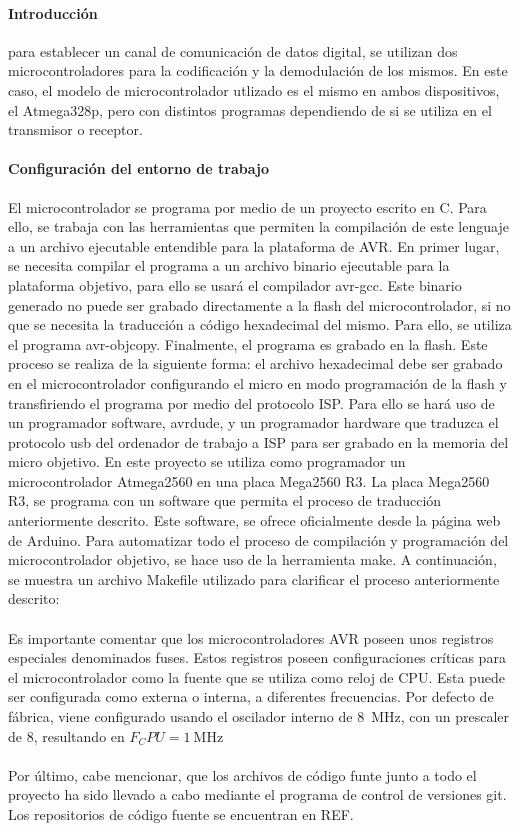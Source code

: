\paragraph{Introducci\'on}
para establecer un canal de comunicación de datos digital, se utilizan dos microcontroladores para la codificación y la demodulación de los mismos. En este caso, el modelo de microcontrolador utlizado es el mismo en ambos dispositivos, el Atmega328p, pero con distintos programas dependiendo de si se utiliza en el transmisor o receptor.

\paragraph{Configuraci\'on del entorno de trabajo}
El microcontrolador se programa por medio de un proyecto escrito en C. Para ello, se trabaja con las herramientas que permiten la compilación de este lenguaje a un archivo ejecutable entendible para la plataforma de AVR.
En primer lugar, se necesita compilar el programa a un archivo binario ejecutable para la plataforma objetivo, para ello se usar\'a el compilador avr-gcc. Este binario generado no puede ser grabado directamente a la flash del microcontrolador, si no que se necesita la traducción a código hexadecimal del mismo. Para ello, se utiliza el programa avr-objcopy. 
Finalmente, el programa es grabado en la flash. Este proceso se realiza de la siguiente forma: el archivo hexadecimal debe ser grabado en el microcontrolador configurando el micro en modo programaci\'on de la flash y transfiriendo el programa por medio del protocolo ISP. Para ello se har\'a uso de un programador software, avrdude, y un programador hardware que traduzca el protocolo usb del ordenador de trabajo a ISP para ser grabado en la memoria del micro objetivo. En este proyecto se utiliza como programador un microcontrolador Atmega2560 en una placa Mega2560 R3. 
La placa Mega2560 R3, se programa con un software que permita el proceso de traducción anteriormente descrito. Este software, se ofrece oficialmente desde la p\'agina web de Arduino.
Para automatizar todo el proceso de compilaci\'on y programaci\'on del microcontrolador objetivo, se hace uso de la herramienta make. A continuaci\'on, se muestra un archivo Makefile utilizado para clarificar el proceso anteriormente descrito:



\paragraph{}
Es importante comentar que los microcontroladores AVR poseen unos registros especiales denominados fuses.
Estos registros poseen configuraciones cr\'iticas para el microcontrolador como la fuente que se utiliza como reloj de CPU. Esta puede ser configurada como externa o interna, a diferentes frecuencias. Por defecto de fábrica, viene configurado usando el oscilador interno de \SI{8}{\mega\hertz}, con un prescaler de 8, resultando en $F_CPU = \SI{1}{\mega\hertz}$
\paragraph{}
Por último, cabe mencionar, que los archivos de código funte junto a todo el proyecto ha sido llevado a cabo mediante el programa de control de versiones git. 
Los repositorios de código fuente se encuentran en REF.

